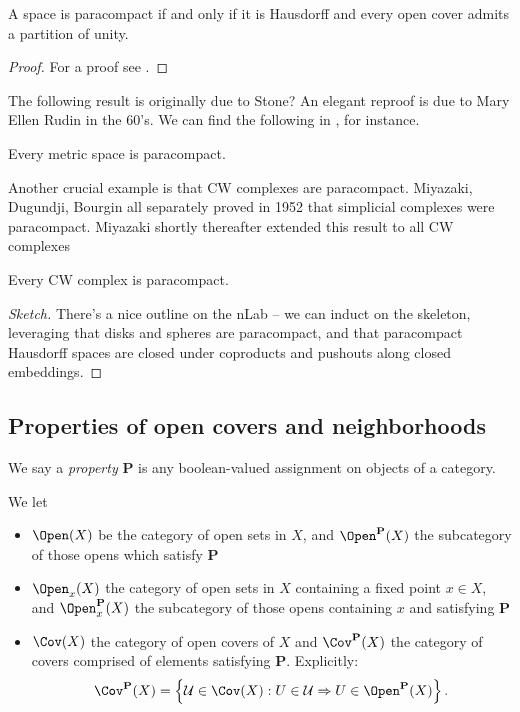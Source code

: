 \documentclass[11pt]{book}
\begin{document}
\begin{theorem}\label{thm:paracompact-partition-unity} 
A space is paracompact if and only if it is Hausdorff and every open cover admits a partition of unity.
\end{theorem}
\begin{proof} For a proof see \cite[pp.~30--31]{Hirzebruch}.
\end{proof}

The following result is originally due to Stone? An elegant reproof is due to Mary Ellen Rudin in the 60's. We can find the following in \cite[41.4]{Munkres}, for instance.

\begin{theorem}\label{thm:metric-space-paracompact} Every metric space is paracompact.
\end{theorem}

Another crucial example is that CW complexes are paracompact. Miyazaki, Dugundji, Bourgin all separately proved in 1952 that simplicial complexes were paracompact. Miyazaki shortly thereafter extended this result to all CW complexes

\begin{theorem}
\label{thm:miyazaki}
Every CW complex is paracompact.
\end{theorem}
\begin{proof}[Sketch] There's a nice outline on the nLab -- we can induct on the skeleton, leveraging that disks and spheres are paracompact, and that paracompact Hausdorff spaces are closed under coproducts and pushouts along closed embeddings.
\end{proof}


\newpage
\subsection{Properties of open covers and neighborhoods}

We say a \emph{property} $\mathbf{P}$ is any boolean-valued assignment on objects of a category.

\begin{notation} We let
\begin{itemize}
    \item $\Open(X)$ be the category of open sets in $X$, and $\Open^{\mathbf{P}}(X)$ the subcategory of those opens which satisfy $\mathbf{P}$
    \item $\Open_x(X)$ the category of open sets in $X$ containing a fixed point $x\in X$, and $\Open_x^{\mathbf{P}}(X)$ the subcategory of those opens containing $x$ and satisfying $\mathbf{P}$
    \item $\Cov(X)$ the category of open covers of $X$ and $\Cov^{\mathbf{P}}(X)$ the category of covers comprised of elements satisfying \textbf{P}. Explicitly:
    \begin{align*}
        \Cov^{\mathbf{P}}(X) = \left\{ \mathcal{U}\in \Cov(X) : U\in \mathcal{U} \Rightarrow U\in \Open^{\mathbf{P}}(X) \right\}.
    \end{align*}
\end{itemize}
\end{notation}
\end{document}
